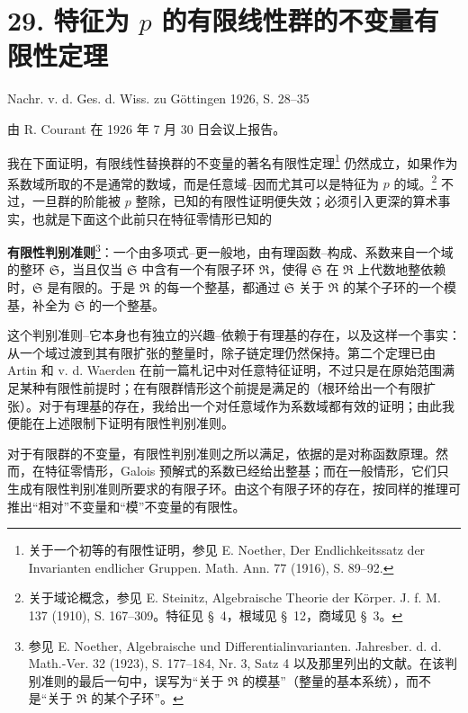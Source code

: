 \setcounter{footnote}{0}

\section*{29. 特征为 $p$ 的有限线性群的不变量有限性定理}

\begin{center}
Nachr. v. d. Ges. d. Wiss. zu Göttingen 1926, S. 28--35
\end{center}

由 R. Courant 在 1926 年 7 月 30 日会议上报告。

我在下面证明，有限线性替换群的不变量的著名有限性定理\footnote{关于一个初等的有限性证明，参见 E. Noether, Der Endlichkeitssatz der Invarianten endlicher Gruppen. Math. Ann. 77 (1916), S. 89--92.} 仍然成立，如果作为系数域所取的不是通常的数域，而是任意域--因而尤其可以是特征为 $p$ 的域。\footnote{关于域论概念，参见 E. Steinitz, Algebraische Theorie der Körper. J. f. M. 137 (1910), S. 167--309。特征见 \S\ 4，根域见 \S\ 12，商域见 \S\ 3。} 不过，一旦群的阶能被 $p$ 整除，已知的有限性证明便失效；必须引入更深的算术事实，也就是下面这个此前只在特征零情形已知的

\textbf{有限性判别准则}\footnote{参见 E. Noether, Algebraische und Differentialinvarianten. Jahresber. d. d. Math.-Ver. 32 (1923), S. 177--184, Nr. 3, Satz 4 以及那里列出的文献。在该判别准则的最后一句中，误写为“关于 $\mathfrak R$ 的模基”（整量的基本系统），而不是“关于 $\mathfrak R$ 的某个子环”。}：一个由多项式--更一般地，由有理函数--构成、系数来自一个域的整环 $\mathfrak S$，当且仅当 $\mathfrak S$ 中含有一个有限子环 $\mathfrak R$，使得 $\mathfrak S$ 在 $\mathfrak R$ 上代数地整依赖时，$\mathfrak S$ 是有限的。于是 $\mathfrak R$ 的每一个整基，都通过 $\mathfrak S$ 关于 $\mathfrak R$ 的某个子环的一个模基，补全为 $\mathfrak S$ 的一个整基。

这个判别准则--它本身也有独立的兴趣--依赖于有理基的存在，以及这样一个事实：从一个域过渡到其有限扩张的整量时，除子链定理仍然保持。第二个定理已由 Artin 和 v. d. Waerden 在前一篇札记中对任意特征证明，不过只是在原始范围满足某种有限性前提时；在有限群情形这个前提是满足的（根环给出一个有限扩张）。对于有理基的存在，我给出一个对任意域作为系数域都有效的证明；由此我便能在上述限制下证明有限性判别准则。

对于有限群的不变量，有限性判别准则之所以满足，依据的是对称函数原理。然而，在特征零情形，Galois 预解式的系数已经给出整基；而在一般情形，它们只生成有限性判别准则所要求的有限子环。由这个有限子环的存在，按同样的推理可推出“相对”不变量和“模”不变量的有限性。

